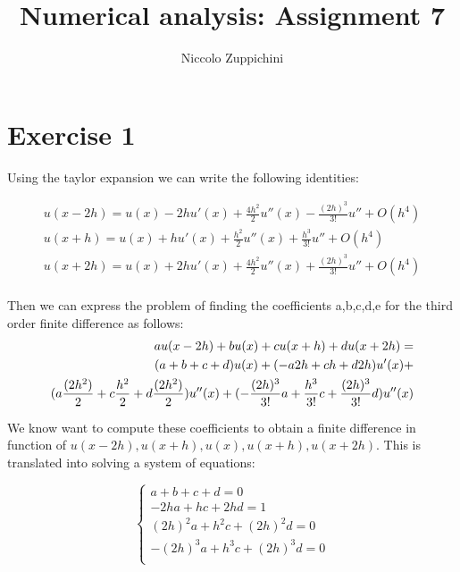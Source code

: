 \documentclass[12pt]{article}
\title{Numerical analysis: Assignment 7}
\author{Niccolo Zuppichini}
\begin{document}
\maketitle
\section*{Exercise 1}

Using the taylor expansion we can write the following identities: 

\begin{equation}
\begin{split}
u(x-2h) = u(x) -2 h u'(x) + \frac{4 h^2}{2} u''(x) - \frac{ (2h)^3}{3!} u'' + O(h^4) \\
u(x+h) = u(x) + h u'(x) + \frac{h^2}{2} u''(x) + \frac{h^3}{3!} u'' + O(h^4) \\
u(x+2h) = u(x) + 2 h u'(x) + \frac{4 h^2}{2} u''(x) + \frac{ (2h)^3}{3!} u'' + O(h^4)  \\
\end{split}	
\label{eq:taylor}
\end{equation}

Then we can express the problem of finding the coefficients a,b,c,d,e for the third order finite difference as follows: 
\begin{equation}
\centering
  \begin{split}
    a u(x-2h) + b u(x) + c u(x+h) + d u(x+2h) =  \\
    (a+b+c+d) u(x) + (-a2h +ch +d 2h) u'(x) + \\
    (a \frac{(2h^2)}{2} + c \frac{h^2}{2} + d \frac{(2h^2)}{2}) u''(x) +
     ( -\frac{(2h)^3}{3!} a +\frac{h^3}{3!} c + \frac{(2h)^3}{3!} d) u''(x)
  \end{split}
\end{equation}


We know want to compute these coefficients to obtain a finite difference in function of $u(x-2h), u(x+h), u(x), u(x+h), u(x+2h)$. This is translated into solving a system of equations: 

\begin{equation}
	\begin{cases}
		a+ b + c + d = 0  \\
		-2h a +h c + 2h d = 1 \\
		(2h)^2 a + h^2 c + (2h)^2 d = 0 \\
		-(2h)^3 a +h^3c + (2h)^3d  = 0 \\
	\end{cases}
	\label{eq:system}
\end{equation}
\end{document}
